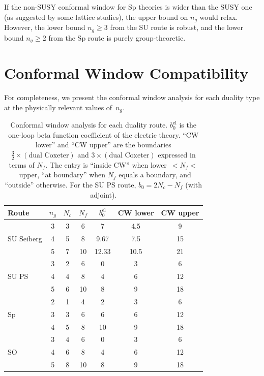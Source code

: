 \documentclass[11pt,a4paper]{article}
\theoremstyle{plain}
\theoremstyle{definition}
\theoremstyle{remark}
\newcommand{\Nc}{N_{\!c}}
\newcommand{\Nf}{N_{\!f}}
\newcommand{\ngen}{n_g}
\begin{document}
If the non-SUSY conformal window for Sp theories is wider than the
SUSY one (as suggested by some lattice studies), the upper bound on
$\ngen$ would relax.  However, the lower bound $\ngen \geq 3$ from the SU
route is robust, and the lower bound $\ngen \geq 2$ from the Sp route is
purely group-theoretic.


\section{Conformal Window Compatibility}
\label{sec:conformal-details}

For completeness, we present the conformal window analysis for each
duality type at the physically relevant values of~$\ngen$.

\begin{table}[h!]
\centering
\renewcommand{\arraystretch}{1.4}
\begin{tabular}{@{}l c c c c c c@{}}
\toprule
\textbf{Route} & $\ngen$ & $\Nc$ & $\Nf$ &
  $b_0^{\text{el}}$ & CW lower & CW upper \\
\midrule
\multirow{3}{*}{SU Seiberg} & 3 & 3 & 6 & 7 & 4.5 & 9 \\
  & 4 & 5 & 8 & 9.67 & 7.5 & 15 \\
  & 5 & 7 & 10 & 12.33 & 10.5 & 21 \\
\midrule
\multirow{3}{*}{SU PS} & 3 & 2 & 6 & 0 & 3 & 6 \\
  & 4 & 4 & 8 & 4 & 6 & 12 \\
  & 5 & 6 & 10 & 8 & 9 & 18 \\
\midrule
\multirow{3}{*}{Sp} & 2 & 1 & 4 & 2 & 3 & 6 \\
  & 3 & 3 & 6 & 6 & 6 & 12 \\
  & 4 & 5 & 8 & 10 & 9 & 18 \\
\midrule
\multirow{3}{*}{SO} & 3 & 4 & 6 & 0 & 3 & 6 \\
  & 4 & 6 & 8 & 4 & 6 & 12 \\
  & 5 & 8 & 10 & 8 & 9 & 18 \\
\bottomrule
\end{tabular}
\caption{Conformal window analysis for each duality route.
$b_0^{\text{el}}$ is the one-loop beta function coefficient of the
electric theory.  ``CW lower'' and ``CW upper'' are the boundaries
$\frac{3}{2} \times (\text{dual Coxeter})$ and
$3 \times (\text{dual Coxeter})$ expressed in terms of $\Nf$.
The entry is ``inside CW'' when
lower~${}<\Nf<{}$~upper, ``at boundary'' when $\Nf$ equals a
boundary, and ``outside'' otherwise.  For the SU PS route,
$b_0 = 2\Nc - \Nf$ (with adjoint).}
\label{tab:conformal}
\end{table}
\end{document}
